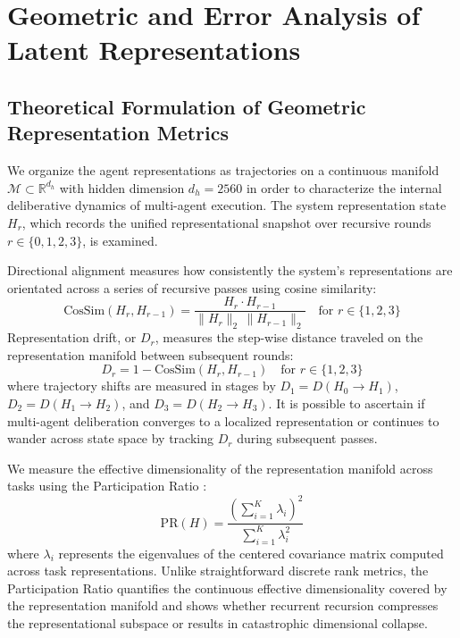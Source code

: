 \documentclass[a4paper, 12pt]{report}
\begin{document}
\chapter{Geometric and Error Analysis of Latent Representations}
\fi

\label{chap.4}
\section{Theoretical Formulation of Geometric Representation Metrics}
We organize the agent representations as trajectories on a continuous manifold $\mathcal{M} \subset \mathbb{R}^{d_h}$ with hidden dimension $d_h = 2560$ in order to characterize the internal deliberative dynamics of multi-agent execution. The system representation state $H_r$, which records the unified representational snapshot over recursive rounds $r \in \{0, 1, 2, 3\}$, is examined.

Directional alignment measures how consistently the system's representations are orientated across a series of recursive passes using cosine similarity:
\begin{equation}
    \text{CosSim}(H_r, H_{r-1}) = \frac{H_r \cdot H_{r-1}}{\|H_r\|_2 \, \|H_{r-1}\|_2} \quad \text{for } r \in \{1, 2, 3\}
\end{equation}
Representation drift, or $D_r$, measures the step-wise distance traveled on the representation manifold between subsequent rounds:
\begin{equation}
    D_r = 1 - \text{CosSim}(H_r, H_{r-1}) \quad \text{for } r \in \{1, 2, 3\}
\end{equation}
where trajectory shifts are measured in stages by $D_1 = D(H_0 \to H_1)$, $D_2 = D(H_1 \to H_2)$, and $D_3 = D(H_2 \to H_3)$. It is possible to ascertain if multi-agent deliberation converges to a localized representation or continues to wander across state space by tracking $D_r$ during subsequent passes.

We measure the effective dimensionality of the representation manifold across tasks using the Participation Ratio \cite{sorscher2022beyond, roy2007effective}:
\begin{equation}
    \text{PR}(H) = \frac{(\sum_{i=1}^K \lambda_i)^2}{\sum_{i=1}^K \lambda_i^2}
\end{equation}
where $\lambda_i$ represents the eigenvalues of the centered covariance matrix computed across task representations. Unlike straightforward discrete rank metrics, the Participation Ratio quantifies the continuous effective dimensionality covered by the representation manifold and shows whether recurrent recursion compresses the representational subspace or results in catastrophic dimensional collapse.
\end{document}
